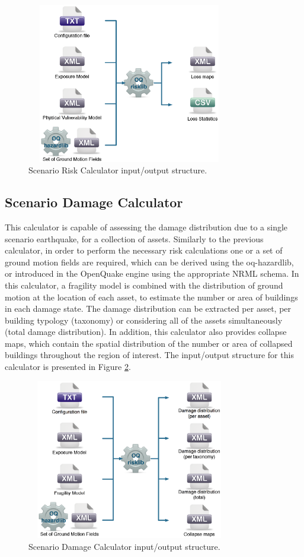 \begin{figure}[ht]
\centering
\includegraphics[width=9cm,height=7cm]{./figures/risk/ScenarioRisk.eps}
\caption{Scenario Risk Calculator input/output structure.}
\label{fig:ScnRisk}
\end{figure}

\subsection{Scenario Damage Calculator}
This calculator is capable of assessing the damage distribution due to a single scenario earthquake, for a collection of assets. Similarly to the previous calculator, in order to perform the necessary risk calculations one or a set of ground motion fields are required, which can be derived using the oq-hazardlib, or introduced in the OpenQuake engine using the appropriate NRML schema.
In this calculator, a fragility model is combined with the distribution of ground motion at the location of each asset, to estimate the number or area of buildings in each damage state. The damage distribution can be extracted per asset, per building typology (taxonomy) or considering all of the assets simultaneously (total damage distribution). In addition, this calculator also provides collapse maps, which contain the spatial distribution of the number or area of collapsed buildings throughout the region of interest. The input/output structure for this calculator is presented in Figure \ref{fig:ScnDamage}.

\begin{figure}[ht]
\centering
\includegraphics[width=9cm,height=7cm]{./figures/risk/ScenarioDamage.eps}
\caption{Scenario Damage Calculator input/output structure.}
\label{fig:ScnDamage}
\end{figure}

